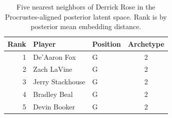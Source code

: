 \begin{table}[htbp]
  \centering\small
  \begin{tabular}{rllc}
    \toprule
    Rank & Player & Position & Archetype \\
    \midrule
    1 & De'Aaron Fox & G & 2 \\
    2 & Zach LaVine & G & 2 \\
    3 & Jerry Stackhouse & G & 2 \\
    4 & Bradley Beal & G & 2 \\
    5 & Devin Booker & G & 2 \\
    \bottomrule
  \end{tabular}
  \caption{Five nearest neighbors of Derrick Rose in the Procrustes-aligned posterior latent space. Rank is by posterior mean embedding distance.}
  \label{tab:Derrick_Rose_neighbors}
\end{table}

